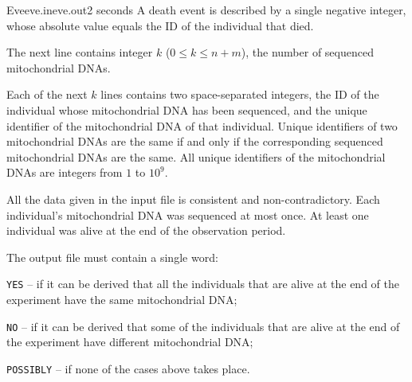 \begin{problem}{Eve}{eve.in}{eve.out}{2 seconds}
A death event is described by a single negative integer, whose absolute value equals
the ID of the individual that died.

The next line contains integer $k$ ($0 \le k \le n + m$),
the number of sequenced mitochondrial DNAs.

Each of the next $k$ lines contains two space-separated integers,
the ID of the individual whose mitochondrial DNA has been sequenced, and
the unique identifier of the mitochondrial DNA of that individual.
Unique identifiers of two mitochondrial DNAs are the same if and only if
the corresponding sequenced mitochondrial DNAs are the same.
All unique identifiers of the mitochondrial DNAs are integers from $1$ to $10^9$.

All the data given in the input file is consistent and non-contradictory.
Each individual's mitochondrial DNA was sequenced at most once.
At least one individual was alive at the end of the observation period.

\OutputFile

The output file must contain a single word:
\begin{shortitems}
\item \texttt{YES} -- if it can be derived that all the individuals that are alive at
the end of the experiment have the same mitochondrial DNA;
\item \texttt{NO} -- if it can be derived that some of the individuals that are alive at
the end of the experiment have different mitochondrial DNA;
\item \texttt{POSSIBLY} -- if none of the cases above takes place.
\end{shortitems}

\Example

\begin{example}
%
%
%
%
\end{example}

\end{problem}
